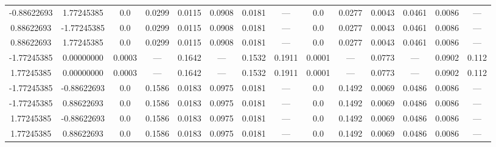 \documentclass[a4paper,14pt]{extarticle}
\begin{document}
\begin{landscape}
\begin{table}[H]
\begin{tabular}{|c|c|*{6}{c}|*{6}{c}|}
-0.88622693        &  1.77245385        & 0.0    & 0.0299 & 0.0115 & 0.0908 & 0.0181 & ---    & 0.0    & 0.0277 & 0.0043 & 0.0461 & 0.0086 & ---   \\
 0.88622693        & -1.77245385        & 0.0    & 0.0299 & 0.0115 & 0.0908 & 0.0181 & ---    & 0.0    & 0.0277 & 0.0043 & 0.0461 & 0.0086 & ---   \\
 0.88622693        &  1.77245385        & 0.0    & 0.0299 & 0.0115 & 0.0908 & 0.0181 & ---    & 0.0    & 0.0277 & 0.0043 & 0.0461 & 0.0086 & ---   \\
-1.77245385        &  0.00000000        & 0.0003 & ---    & 0.1642 & ---    & 0.1532 & 0.1911 & 0.0001 & ---    & 0.0773 & ---    & 0.0902 & 0.112 \\
 1.77245385        &  0.00000000        & 0.0003 & ---    & 0.1642 & ---    & 0.1532 & 0.1911 & 0.0001 & ---    & 0.0773 & ---    & 0.0902 & 0.112 \\
-1.77245385        & -0.88622693        & 0.0    & 0.1586 & 0.0183 & 0.0975 & 0.0181 & ---    & 0.0    & 0.1492 & 0.0069 & 0.0486 & 0.0086 & ---   \\
-1.77245385        &  0.88622693        & 0.0    & 0.1586 & 0.0183 & 0.0975 & 0.0181 & ---    & 0.0    & 0.1492 & 0.0069 & 0.0486 & 0.0086 & ---   \\
 1.77245385        & -0.88622693        & 0.0    & 0.1586 & 0.0183 & 0.0975 & 0.0181 & ---    & 0.0    & 0.1492 & 0.0069 & 0.0486 & 0.0086 & ---   \\
 1.77245385        &  0.88622693        & 0.0    & 0.1586 & 0.0183 & 0.0975 & 0.0181 & ---    & 0.0    & 0.1492 & 0.0069 & 0.0486 & 0.0086 & ---   \\
\hline
\end{tabular}
\end{table} 


\end{landscape}
\end{document}
